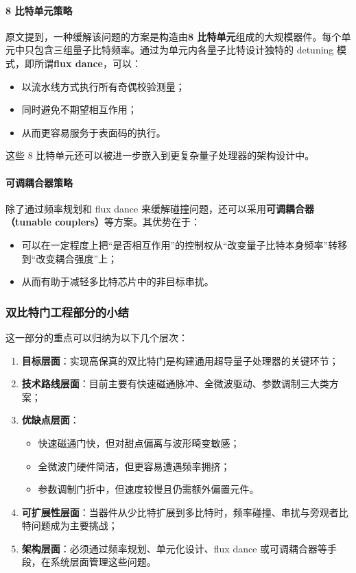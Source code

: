 \documentclass[12pt,a4paper,oneside]{ctexbook}
\begin{document}
\paragraph{8 比特单元策略}
原文提到，一种缓解该问题的方案是构造由\textbf{8 比特单元}组成的大规模器件。每个单元中只包含三组量子比特频率。通过为单元内各量子比特设计独特的 detuning 模式，即所谓\textbf{flux dance}，可以：
\begin{itemize}
    \item 以流水线方式执行所有奇偶校验测量；
    \item 同时避免不期望相互作用；
    \item 从而更容易服务于表面码的执行。
\end{itemize}

这些 8 比特单元还可以被进一步嵌入到更复杂量子处理器的架构设计中。

\paragraph{可调耦合器策略}
除了通过频率规划和 flux dance 来缓解碰撞问题，还可以采用\textbf{可调耦合器（tunable couplers）}等方案。其优势在于：
\begin{itemize}
    \item 可以在一定程度上把“是否相互作用”的控制权从“改变量子比特本身频率”转移到“改变耦合强度”上；
    \item 从而有助于减轻多比特芯片中的非目标串扰。
\end{itemize}

\subsubsection{双比特门工程部分的小结}

这一部分的重点可以归纳为以下几个层次：

\begin{enumerate}
    \item \textbf{目标层面}：实现高保真的双比特门是构建通用超导量子处理器的关键环节；
    \item \textbf{技术路线层面}：目前主要有快速磁通脉冲、全微波驱动、参数调制三大类方案；
    \item \textbf{优缺点层面}：
    \begin{itemize}
        \item 快速磁通门快，但对甜点偏离与波形畸变敏感；
        \item 全微波门硬件简洁，但更容易遭遇频率拥挤；
        \item 参数调制门折中，但速度较慢且仍需额外偏置元件。
    \end{itemize}
    \item \textbf{可扩展性层面}：当器件从少比特扩展到多比特时，频率碰撞、串扰与旁观者比特问题成为主要挑战；
    \item \textbf{架构层面}：必须通过频率规划、单元化设计、flux dance 或可调耦合器等手段，在系统层面管理这些问题。
\end{enumerate}
\end{document}
